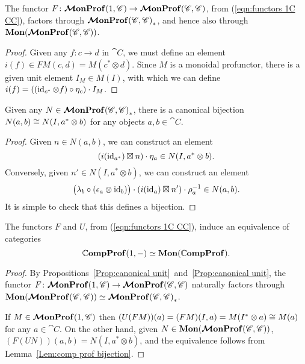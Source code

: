 \documentclass[12pt,oneside,article,draft]{memoir}
\begin{document}
\begin{proposition}\label{Prop:canonical unit}
   The functor $F\colon\bm{\mathcal{M}}\mathbf{onProf}(1,\mathscr{C})\to\bm{\mathcal{M}}\mathbf{onProf}(\mathscr{C},\mathscr{C})$, from (\ref{eqn:functors 1C CC}), factors through $\bm{\mathcal{M}}\mathbf{onProf}{(\mathscr{C},\mathscr{C})}_*$, and hence also through $\mathbf{Mon}(\bm{\mathcal{M}}\mathbf{onProf}(\mathscr{C},\mathscr{C}))$.
\end{proposition}
\begin{proof}
   Given any $f\colon c\to d$ in $\cat{C}$, we must define an element $i(f)\in FM(c,d)=M(c^*\otimes d)$.
   Since $M$ is a monoidal profunctor, there is a given unit element $I_M\in M(I)$, with which we can define $i(f)=((\operatorname{id}_{c^*}\otimes f)\circ\eta_c)\cdot I_M$.
\end{proof}

\begin{lemma}\label{Lem:comp prof bijection}
   Given any $N\in\bm{\mathcal{M}}\mathbf{onProf}{(\mathscr{C},\mathscr{C})}_*$, there is a canonical bijection $N(a,b)\cong N(I,a^*\otimes b)$ for any objects $a,b\in\cat{C}$.
\end{lemma}
\begin{proof}
   Given $n\in N(a,b)$, we can construct an element
   \[
      (i(\operatorname{id}_{a^*})\boxtimes n)\cdot\eta_a \in N(I,a^*\otimes b).
   \]
   Conversely, given $n'\in N(I,a^*\otimes b)$, we can construct an element
   \[
      \bigl(\lambda_b\circ(\epsilon_a\otimes\operatorname{id}_b)\bigr)\cdot(i(\operatorname{id}_a)\boxtimes n')\cdot\rho_a^{-1} \in N(a,b).
   \]
   It is simple to check that this defines a bijection.
\end{proof}

\begin{proposition}\label{Prop:mon prof equivalence}
   The functors $F$ and $U$, from (\ref{eqn:functors 1C CC}), induce an equivalence of categories
   \[
      \mathbb{C}\mathbf{ompProf}(1,-)\simeq\mathbf{Mon}(\mathbb{C}\mathbf{ompProf}).
   \]
\end{proposition}
\begin{proof}
   By Propositions~\ref{Prop:canonical unit}~and~\ref{Prop:canonical unit}, the functor
   $F\colon\bm{\mathcal{M}}\mathbf{onProf}(1,\mathscr{C}) \to \bm{\mathcal{M}}\mathbf{onProf}(\mathscr{C},\mathscr{C})$ naturally factors through
   $\mathbf{Mon}(\bm{\mathcal{M}}\mathbf{onProf}(\mathscr{C},\mathscr{C}))\simeq\bm{\mathcal{M}}\mathbf{onProf}{(\mathscr{C},\mathscr{C})}_*$.

   If $M\in\bm{\mathcal{M}}\mathbf{onProf}(1,\mathscr{C})$ then $(U(FM))(a)=(FM)(I,a)=M(I^*\otimes a)\cong M(a)$ for any
   $a\in\cat{C}$.  On the other hand, given $N\in\mathbf{Mon}(\bm{\mathcal{M}}\mathbf{onProf}(\mathscr{C},\mathscr{C}))$,
   $(F(UN))(a,b)=N(I,a^*\otimes b)$, and the equivalence follows from Lemma~\ref{Lem:comp prof
   bijection}.
\end{proof}
\end{document}

